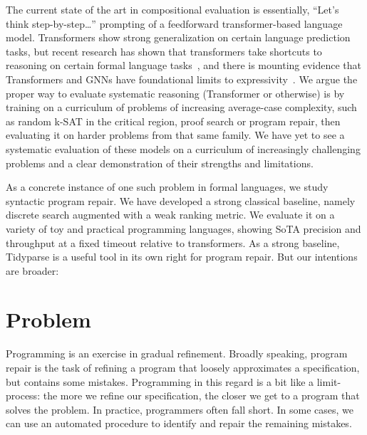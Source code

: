 \documentclass[sigplan,screen]{acmart}
\begin{document}
The current state of the art in compositional evaluation is essentially, ``Let's think step-by-step\ldots'' prompting of a feedforward transformer-based language model. Transformers show strong generalization on certain language prediction tasks, but recent research has shown that transformers take shortcuts to reasoning on certain formal language tasks~\cite{dziri2023faith, liu2022transformers}, and there is mounting evidence that Transformers and GNNs have foundational limits to expressivity~\cite{merrill2022saturated, chiang2023tighter}. We argue the proper way to evaluate systematic reasoning (Transformer or otherwise) is by training on a curriculum of problems of increasing average-case complexity, such as random k-SAT in the critical region, proof search or program repair, then evaluating it on harder problems from that same family. We have yet to see a systematic evaluation of these models on a curriculum of increasingly challenging problems and a clear demonstration of their strengths and limitations.

As a concrete instance of one such problem in formal languages, we study syntactic program repair. We have developed a strong classical baseline, namely discrete search augmented with a weak ranking metric. We evaluate it on a variety of toy and practical programming languages, showing SoTA precision and throughput at a fixed timeout relative to transformers. As a strong baseline, Tidyparse is a useful tool in its own right for program repair. But our intentions are broader:

\section{Problem}


Programming is an exercise in gradual refinement. Broadly speaking, program repair is the task of refining a program that loosely approximates a specification, but contains some mistakes. Programming in this regard is a bit like a limit-process: the more we refine our specification, the closer we get to a program that solves the problem. In practice, programmers often fall short. In some cases, we can use an automated procedure to identify and repair the remaining mistakes.
\end{document}
